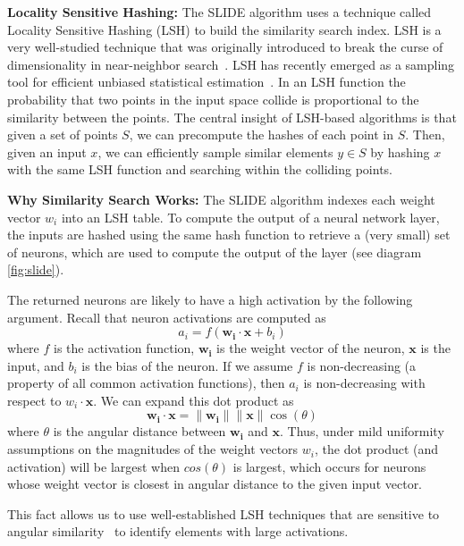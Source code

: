 \documentclass[sigconf]{acmart}
\begin{document}
\noindent\textbf{Locality Sensitive Hashing:}
The SLIDE algorithm uses a technique called Locality Sensitive Hashing (LSH) to build the similarity search index. LSH is a very well-studied technique that was originally introduced to break the curse of dimensionality in near-neighbor search~\cite{indyk1998approximate,andoni2008near,andoni2015optimal,andoni2014beyond,10.1145/997817.997857}. LSH has recently emerged as a sampling tool for efficient unbiased statistical estimation~\cite{spring2017scalable,charikar2017hashing,backurs2019space,siminelakis2019rehashing}. In an LSH function the probability that two points in the input space collide is proportional to the similarity between the points. The central insight of LSH-based algorithms is that given a set of points $S$, we can precompute the hashes of each point in $S$. Then, given an input $x$, we can efficiently sample similar elements $y \in S$ by hashing $x$ with the same LSH function and searching within the colliding points. 





\noindent\textbf{Why Similarity Search Works:}
The SLIDE algorithm indexes each weight vector $w_i$ into an LSH table. To compute the output of a neural network layer, the inputs are hashed using the same hash function to retrieve a (very small) set of neurons, which are used to compute the output of the layer (see diagram \ref{fig:slide}).

The returned neurons are likely to have a high activation by the following argument. Recall that neuron activations are computed as 
$$a_i = f(\mathbf{w_i} \cdot \mathbf{x} + b_i)$$
where $f$ is the activation function, $\mathbf{w_i}$ is the weight vector of the neuron, $\mathbf{x}$ is the input, and $b_i$ is the bias of the neuron. If we assume $f$ is non-decreasing (a property of all common activation functions), then $a_i$ is non-decreasing with respect to $w_i \cdot \mathbf{x}$. We can expand this dot product as $$\mathbf{w_i} \cdot \mathbf{x} = \| \mathbf{w_i} \| \| \mathbf{x} \| \cos(\theta)$$ where $\theta$ is the angular distance between $\mathbf{w_i}$ and $\mathbf{x}$. Thus, under mild uniformity assumptions on the magnitudes of the weight vectors $w_i$, the dot product (and activation) will be largest when $cos(\theta)$ is largest, which occurs for neurons whose weight vector is closest in angular distance to the given input vector.

This fact allows us to use well-established LSH techniques that are sensitive to angular similarity~\cite{goemans1994879,charikar2002similarity,li2012one,shrivastava2014improved} to identify elements with large activations. 
\end{document}
